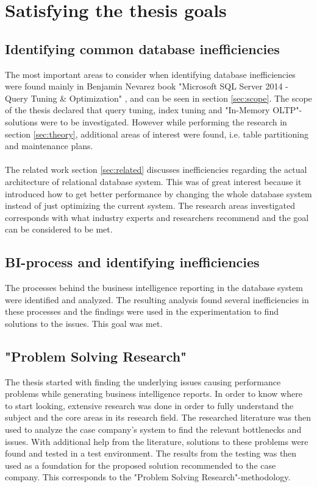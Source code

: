\documentclass{cslthse-msc}
\begin{document}
\section{Satisfying the thesis goals}

\subsection{Identifying common database inefficiencies}
The most important areas to consider when identifying database inefficiencies were found mainly in Benjamin Nevarez book "Microsoft SQL Server 2014 - Query Tuning \& Optimization" \cite{Nevarez}, and can be seen in section \ref{sec:scope}. The scope of the thesis declared that query tuning, index tuning and "In-Memory OLTP"-solutions were to be investigated. However while performing the research in section \ref{sec:theory}, additional areas of interest were found, i.e. table partitioning and maintenance plans. \\\\
The related work section \ref{sec:related} discusses inefficiencies regarding the actual architecture of relational database system. This was of great interest because it introduced how to get better performance by changing the whole database system instead of just optimizing the current system. The research areas investigated corresponds with what industry experts and researchers recommend and the goal can be considered to be met.

\subsection{BI-process and identifying inefficiencies}
The processes behind the business intelligence reporting in the database system were identified and analyzed. The resulting analysis found several inefficiencies in these processes and the findings were used in the experimentation to find solutions to the issues. This goal was met.

\subsection{"Problem Solving Research"}
The thesis started with finding the underlying issues causing performance problems while generating business intelligence reports. In order to know where to start looking, extensive research was done in order to fully understand the subject and the core areas in its research field. The researched literature was then used to analyze the case company's system to find the relevant bottlenecks and issues. With additional help from the literature, solutions to these problems were found and tested in a test environment. The results from the testing was then used as a foundation for the proposed solution recommended to the case company. This corresponds to the "Problem Solving Research"-methodology.  
\end{document}
